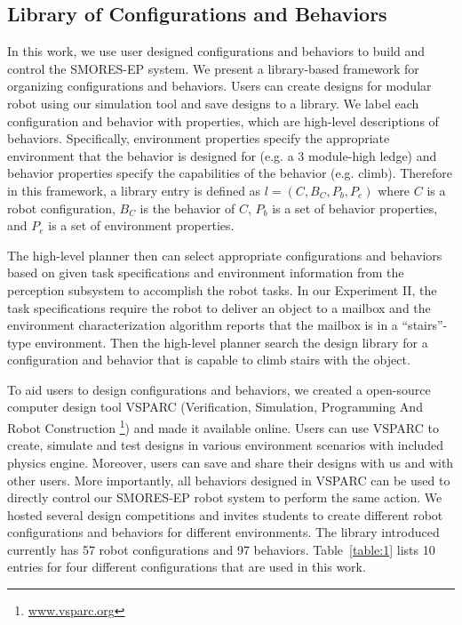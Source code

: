 \documentclass[12pt]{article}
\begin{document}
%



\subsection{Library of Configurations and Behaviors}
\label{sec:configuration-specifics}

In this work, we use user designed configurations and behaviors to build and control the SMORES-EP system.
We present a library-based framework for organizing configurations and behaviors.
Users can create designs for modular robot using our simulation tool and save designs to a library.
We label each configuration and behavior with properties, which are high-level descriptions of behaviors.
Specifically, environment properties specify the appropriate environment that the behavior is designed for (e.g. a 3 module-high ledge) and behavior properties specify the capabilities of the behavior (e.g. climb). 
Therefore in this framework, a library entry is defined as $l = (C,B_C,P_b,P_e)$ where $C$ is a robot configuration, $B_C$ is the behavior of $C$, $P_b$ is a set of behavior properties, and $P_e$ is a set of environment properties.

The high-level planner then can select appropriate configurations and behaviors based on given task specifications and environment information from the perception subsystem to accomplish the robot tasks.
In our Experiment II, the task specifications require the robot to deliver an object to a mailbox and the environment characterization algorithm reports that the mailbox is in a ``stairs''-type environment.
Then the high-level planner search the design library for a configuration and behavior that is capable to climb stairs with the object.

To aid users to design configurations and behaviors, we created a open-source computer design tool VSPARC (Verification, Simulation, Programming And Robot Construction \footnote{\url{www.vsparc.org}}) and made it available online.
Users can use VSPARC to create, simulate and test designs in various environment scenarios with included physics engine.
Moreover, users can save and share their designs with us and with other users.
More importantly, all behaviors designed in VSPARC can be used to directly control our SMORES-EP robot system to perform the same action.
We hosted several design competitions and invites students to create different robot configurations and behaviors for different environments.
The library introduced currently has 57 robot configurations and 97 behaviors.
Table~\ref{table:1} lists 10 entries for four different configurations that are used in this work.
\end{document}
